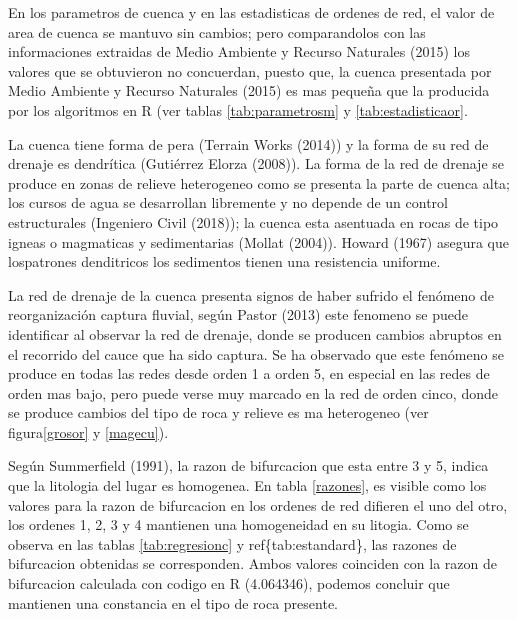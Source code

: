\documentclass[11pt,]{article}
\begin{document}
En los parametros de cuenca y en las estadisticas de ordenes de red, el
valor de area de cuenca se mantuvo sin cambios; pero comparandolos con
las informaciones extraidas de Medio Ambiente y Recurso Naturales (2015)
los valores que se obtuvieron no concuerdan, puesto que, la cuenca
presentada por Medio Ambiente y Recurso Naturales (2015) es mas pequeña
que la producida por los algoritmos en R (ver tablas
\ref{tab:parametrosm} y \ref{tab:estadisticaor}.

La cuenca tiene forma de pera (Terrain Works (2014)) y la forma de su
red de drenaje es dendrítica (Gutiérrez Elorza (2008)). La forma de la
red de drenaje se produce en zonas de relieve heterogeneo como se
presenta la parte de cuenca alta; los cursos de agua se desarrollan
libremente y no depende de un control estructurales (Ingeniero Civil
(2018)); la cuenca esta asentuada en rocas de tipo igneas o magmaticas y
sedimentarias (Mollat (2004)). Howard (1967) asegura que lospatrones
denditricos los sedimentos tienen una resistencia uniforme.

La red de drenaje de la cuenca presenta signos de haber sufrido el
fenómeno de reorganización captura fluvial, según Pastor (2013) este
fenomeno se puede identificar al observar la red de drenaje, donde se
producen cambios abruptos en el recorrido del cauce que ha sido captura.
Se ha observado que este fenómeno se produce en todas las redes desde
orden 1 a orden 5, en especial en las redes de orden mas bajo, pero
puede verse muy marcado en la red de orden cinco, donde se produce
cambios del tipo de roca y relieve es ma heterogeneo (ver
figura\ref{grosor} y \ref{magecu}).

Según Summerfield (1991), la razon de bifurcacion que esta entre 3 y 5,
indica que la litologia del lugar es homogenea. En tabla \ref{razones},
es visible como los valores para la razon de bifurcacion en los ordenes
de red difieren el uno del otro, los ordenes 1, 2, 3 y 4 mantienen una
homogeneidad en su litogia. Como se observa en las tablas
\ref{tab:regresionc} y ref\{tab:estandard\}, las razones de bifurcacion
obtenidas se corresponden. Ambos valores coinciden con la razon de
bifurcacion calculada con codigo en R (4.064346), podemos concluir que
mantienen una constancia en el tipo de roca presente.
\end{document}
